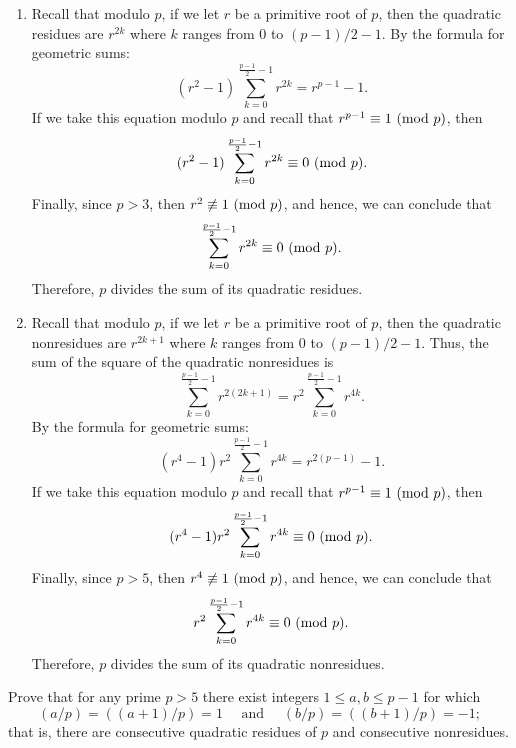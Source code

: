 \begin{solution}
    \begin{enumerate}
        \item Recall that modulo $p$, if we let $r$ be a primitive root of $p$, then the quadratic residues are $r^{2k}$ where $k$ ranges from 0 to $(p-1)/2 - 1$. By the formula for geometric sums:
        $$(r^2 - 1)\sum_{k=0}^{\frac{p-1}{2} - 1}r^{2k} = r^{p-1} - 1.$$
        If we take this equation modulo $p$ and recall that $r^{p-1} \equiv 1 \ (\mathrm{mod}\ p)$, then 
        $$(r^2 - 1)\sum_{k=0}^{\frac{p-1}{2} - 1}r^{2k} \equiv 0 \ (\mathrm{mod}\ p).$$
        Finally, since $p > 3$, then $r^2 \not\equiv 1 \ (\mathrm{mod}\ p)$, and hence, we can conclude that 
        $$\sum_{k=0}^{\frac{p-1}{2} - 1}r^{2k} \equiv 0 \ (\mathrm{mod}\ p).$$
        Therefore, $p$ divides the sum of its quadratic residues.
        \item Recall that modulo $p$, if we let $r$ be a primitive root of $p$, then the quadratic nonresidues are $r^{2k + 1}$ where $k$ ranges from 0 to $(p-1)/2 - 1$. Thus, the sum of the square of the quadratic nonresidues is
        $$\sum_{k=0}^{\frac{p-1}{2} - 1}r^{2(2k+1)} = r^2\sum_{k=0}^{\frac{p-1}{2} - 1}r^{4k}.$$
        By the formula for geometric sums:
        $$(r^4 - 1)r^2\sum_{k=0}^{\frac{p-1}{2} - 1}r^{4k} = r^{2(p-1)} - 1.$$
        If we take this equation modulo $p$ and recall that $r^{p-1} \equiv 1 \ (\mathrm{mod}\ p)$, then 
        $$(r^4 - 1)r^2\sum_{k=0}^{\frac{p-1}{2} - 1}r^{4k} \equiv 0 \ (\mathrm{mod}\ p).$$
        Finally, since $p > 5$, then $r^4 \not\equiv 1 \ (\mathrm{mod}\ p)$, and hence, we can conclude that 
        $$r^2\sum_{k=0}^{\frac{p-1}{2} - 1}r^{4k} \equiv 0 \ (\mathrm{mod}\ p).$$
        Therefore, $p$ divides the sum of its quadratic nonresidues. \\
    \end{enumerate}
\end{solution}

\begin{exercise}
    Prove that for any prime $p > 5$ there exist integers $1 \leq a,b \leq p-1$ for which
    $$(a/p) = ((a+1)/p) = 1 \quad \text{ and } \quad (b/p) = ((b+1)/p) = -1;$$
    that is, there are consecutive quadratic residues of $p$ and consecutive nonresidues. \\
\end{exercise}

